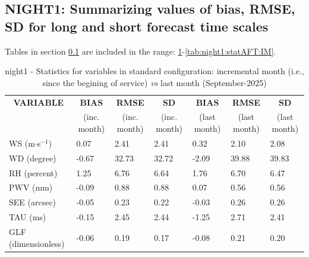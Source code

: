 \subsection{NIGHT1: Summarizing values of bias, RMSE, SD for long and short forecast time scales}\label{subsec:night1:stat}
Tables in section \ref{subsec:night1:stat} are included in the range: \ref{tab:night1:statBEF}-\ref{tab:night1:statAFT:IM}.
\begin{table}[h!]
\begin{center}
\begin{tabular}{|l|l|l|l|l|l|l|}
\hline
\multicolumn{1}{|c|}{\cellcolor[HTML]{C0C0C0}\textbf{VARIABLE}} & \multicolumn{1}{c|}{\cellcolor[HTML]{C0C0C0}\textbf{BIAS}} & \multicolumn{1}{c|}{\cellcolor[HTML]{C0C0C0}\textbf{RMSE}} & \multicolumn{1}{c|}{\cellcolor[HTML]{C0C0C0}\textbf{SD}} & \multicolumn{1}{c|}{\cellcolor[HTML]{C0C0C0}\textbf{BIAS}} & \multicolumn{1}{c|}{\cellcolor[HTML]{C0C0C0}\textbf{RMSE}} & \multicolumn{1}{c|}{\cellcolor[HTML]{C0C0C0}\textbf{SD}}\\
\multicolumn{1}{|c|}{\cellcolor[HTML]{C0C0C0}} & \multicolumn{1}{c|}{\cellcolor[HTML]{C0C0C0}(inc. month)} & \multicolumn{1}{c|}{\cellcolor[HTML]{C0C0C0}(inc. month)} & \multicolumn{1}{c|}{\cellcolor[HTML]{C0C0C0}(inc. month)} & \multicolumn{1}{c|}{\cellcolor[HTML]{C0C0C0}(last month)} & \multicolumn{1}{c|}{\cellcolor[HTML]{C0C0C0}(last month)} & \multicolumn{1}{c|}{\cellcolor[HTML]{C0C0C0}(last month)}\\\hline
\cellcolor[HTML]{C0C0C0}WS (m$\cdot$s$^{-1}$) &      0.07  &      2.41  &      2.41  &      0.32     &      2.10     &      2.08\\
\cellcolor[HTML]{C0C0C0}WD (degree)           &     -0.67  &     32.73  &     32.72  &     -2.09     &     39.88     &     39.83\\
\cellcolor[HTML]{C0C0C0}RH (percent)          &      1.25  &      6.76  &      6.64  &      1.76     &      6.70     &      6.47\\
\cellcolor[HTML]{C0C0C0}PWV (mm)              &     -0.09 &      0.88 &      0.88 &      0.07    &      0.56    &      0.56\\
\cellcolor[HTML]{C0C0C0}SEE (arcsec)          &     -0.05 &      0.23 &      0.22 &     -0.03    &      0.26    &      0.26\\
\cellcolor[HTML]{C0C0C0}TAU (ms)              &     -0.15 &      2.45 &      2.44 &     -1.25    &      2.71    &      2.41\\
\cellcolor[HTML]{C0C0C0}GLF (dimensionless)   &     -0.06 &      0.19 &      0.17 &     -0.08    &      0.21    &      0.20\\
\hline
\end{tabular}
\caption{night1 - Statistics for variables in standard configuration: incremental month (i.e., since the begining of service) \textit{vs} last month (September-2025)}\label{tab:night1:statBEF}
\end{center}
\end{table}

